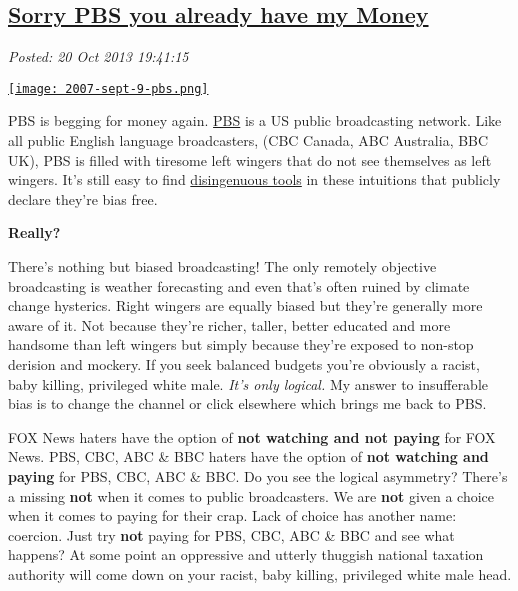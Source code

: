 %

\subsection*{\href{http://bakerjd99.wordpress.com/2013/10/20/sorry-pbs-you-already-have-my-money/}{Sorry PBS you already have my Money}}


\noindent\emph{Posted: 20 Oct 2013 19:41:15}
\vspace{6pt}

\captionsetup[floatingfigure]{labelformat=empty}
\begin{floatingfigure}[r]{0.40\textwidth}
\centering
\href{http://www.freneticfunnies.com/weeklies/2007-sept-9-PBS.php}{\texttt{[image: 2007-sept-9-pbs.png]}}
\label{fig:4308X0}
\end{floatingfigure} PBS
is begging for money again. \href{http://www.pbs.org/}{PBS} is a US
public broadcasting network. Like all public English language
broadcasters, (CBC Canada, ABC Australia, BBC UK), PBS is filled with
tiresome left wingers that do not see themselves as left wingers. It's
still easy to find \href{http://billmoyers.com/}{disingenuous tools} in
these intuitions that publicly declare they're bias free.

\textbf{Really?}

There's nothing but biased broadcasting! The only remotely objective
broadcasting is weather forecasting and even that's often ruined by
climate change hysterics. Right wingers are equally biased but they're
generally more aware of it. Not because they're richer, taller, better
educated and more handsome than left wingers but simply because they're
exposed to non-stop derision and mockery. If you seek balanced budgets
you're obviously a racist, baby killing, privileged white male.
\emph{It's only logical.} My answer to insufferable bias is to change
the channel or click elsewhere which brings me back to PBS.

FOX News haters have the option of \textbf{not watching and not paying}
for FOX News. PBS, CBC, ABC \& BBC haters have the option of \textbf{not
watching and paying} for PBS, CBC, ABC \& BBC. Do you see the logical
asymmetry? There's a missing \textbf{not} when it comes to public
broadcasters. We are \textbf{not} given a choice when it comes to paying
for their crap. Lack of choice has another name: coercion. Just try
\textbf{not} paying for PBS, CBC, ABC \& BBC and see what happens? At
some point an oppressive and utterly thuggish national taxation
authority will come down on your racist, baby killing, privileged white
male head.

